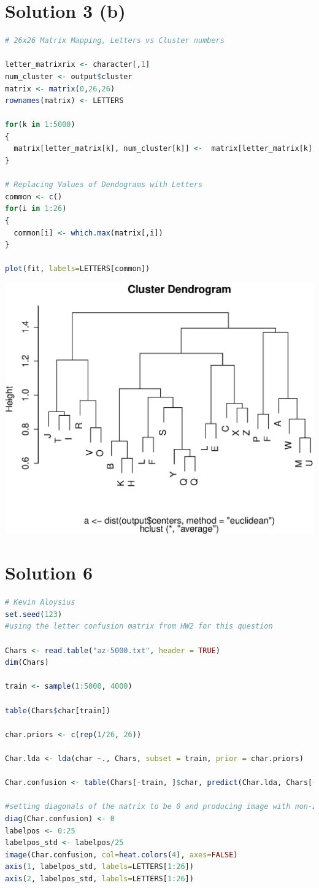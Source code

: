 \documentclass[a4paper,20pt]{article}
\begin{document}
\section*{Solution 3 (b)}
\begin{lstlisting}[language = R]
# 26x26 Matrix Mapping, Letters vs Cluster numbers

letter_matrixrix <- character[,1]
num_cluster <- output$cluster 
matrix <- matrix(0,26,26)
rownames(matrix) <- LETTERS

for(k in 1:5000)
{ 
  matrix[letter_matrix[k], num_cluster[k]] <-  matrix[letter_matrix[k], num_cluster[k]] + 1
}

# Replacing Values of Dendograms with Letters
common <- c()
for(i in 1:26)
{
  common[i] <- which.max(matrix[,i])
}

plot(fit, labels=LETTERS[common])
\end{lstlisting}
\begin{center}
\includegraphics[scale=0.7]{dendogram_letters.eps}
\end{center}
\newpage
\section*{Solution 6}
\begin{lstlisting}[language = R]
# Kevin Aloysius
set.seed(123)
#using the letter confusion matrix from HW2 for this question

Chars <- read.table("az-5000.txt", header = TRUE) 
dim(Chars) 

train <- sample(1:5000, 4000) 

table(Chars$char[train]) 

char.priors <- c(rep(1/26, 26)) 

Char.lda <- lda(char ~., Chars, subset = train, prior = char.priors) 

Char.confusion <- table(Chars[-train, ]$char, predict(Char.lda, Chars[-train, ])$class)

#setting diagonals of the matrix to be 0 and producing image with non-zero entries colored
diag(Char.confusion) <- 0
labelpos <- 0:25
labelpos_std <- labelpos/25
image(Char.confusion, col=heat.colors(4), axes=FALSE)
axis(1, labelpos_std, labels=LETTERS[1:26])
axis(2, labelpos_std, labels=LETTERS[1:26])
\end{lstlisting}
\end{document}
